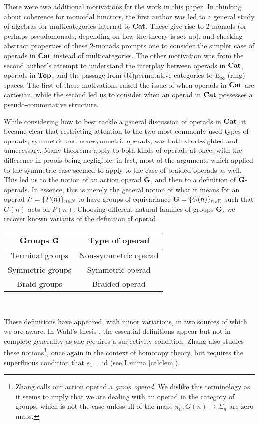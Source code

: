 There were two additional motivations for the work in this paper.  In thinking about coherence for monoidal functors, the first author was led to a general study of algebras for multicategories internal to $\mathbf{Cat}$.  These give rise to 2-monads (or perhaps pseudomonads, depending on how the theory is set up), and checking abstract properties of these 2-monads prompts one to consider the simpler case of operads in $\mathbf{Cat}$ instead of multicategories.  The other motivation was from the second author's attempt to understand the interplay between operads in $\mathbf{Cat}$, operads in $\mathbf{Top}$, and the passage from (bi)permutative categories to $E_{\infty}$ (ring) spaces.  The first of these motivations raised the issue of when operads in $\mathbf{Cat}$ are cartesian, while the second led us to consider when an operad in $\mathbf{Cat}$ possesses a pseudo-commutative structure.

While considering how to best tackle a general discussion of operads in $\mathbf{Cat}$, it became clear that restricting attention to the two most commonly used types of operads, symmetric and non-symmetric operads, was both short-sighted and unnecessary.  Many theorems apply to both kinds of operads at once, with the difference in proofs being negligible; in fact, most of the arguments which applied to the symmetric case seemed to apply to the case of braided operads as well.   This led us to the notion of an action operad $\mathbf{G}$, and then to a definition of $\mathbf{G}$-operads.  In essence, this is merely the general notion of what it means for an operad $P = \{ P(n) \}_{n \in \mathbb{N}}$ to have groups of equivariance $\mathbf{G} = \{ G(n) \}_{n \in \mathbb{N}}$ such that $G(n)$ acts on $P(n)$.  Choosing different natural families of groups $\mathbf{G}$, we recover known variants of the definition of operad. \\ \begin{center}
\begin{tabular}{c|c}
Groups $\mathbf{G}$ & Type of operad  \\ \hline
Terminal groups & Non-symmetric operad \\
Symmetric groups & Symmetric operad \\
Braid groups & Braided operad \\
\end{tabular} \\ \end{center}
These definitions have appeared, with minor variations, in two sources of which we are aware.  In Wahl's thesis \cite{wahl-thesis}, the essential definitions appear but not in complete generality as she requires a surjectivity condition.  Zhang \cite{zhang-grp} also studies these notions\footnote{Zhang calls our action operad a \textit{group operad}.  We dislike this terminology as it seems to imply that we are dealing with an operad in the category of groups, which is not the case unless all of the maps $\pi_{n}:G(n) \rightarrow \Sigma_{n}$ are zero maps.}, once again in the context of homotopy theory, but requires the  superfluous condition that $e_{1} = \textrm{id}$ (see Lemma \ref{calclem}).

